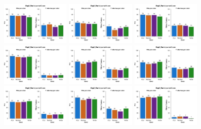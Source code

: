 \begin{figure}[th]
\includegraphics[width=0.30\textwidth]{Figures/Color_Exp2_P10} \includegraphics[width=0.30\textwidth]{Figures/Color_Exp2_P11} \includegraphics[width=0.30\textwidth]{Figures/Color_Exp2_P12}
\includegraphics[width=0.30\textwidth]{Figures/Color_Exp2_P13} \includegraphics[width=0.30\textwidth]{Figures/Color_Exp2_P14} \includegraphics[width=0.30\textwidth]{Figures/Color_Exp2_P15}
\includegraphics[width=0.30\textwidth]{Figures/Color_Exp2_P16} \includegraphics[width=0.30\textwidth]{Figures/Color_Exp2_P17} \includegraphics[width=0.30\textwidth]{Figures/Color_Exp2_P18}

\end{figure}
